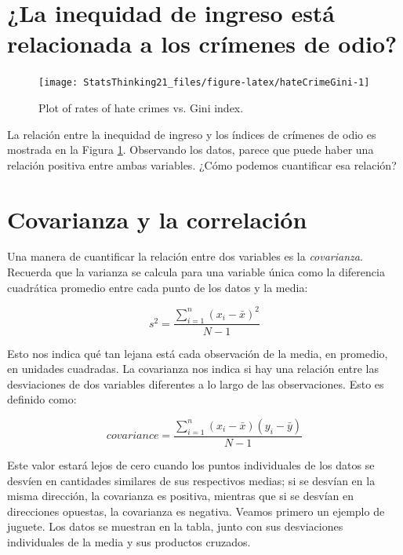 \documentclass[
  12pt,
]{book}
\begin{document}
\hypertarget{la-inequidad-de-ingreso-estuxe1-relacionada-a-los-cruxedmenes-de-odio}{%
\section{¿La inequidad de ingreso está relacionada a los crímenes de odio?}\label{la-inequidad-de-ingreso-estuxe1-relacionada-a-los-cruxedmenes-de-odio}}

\begin{figure}
\texttt{[image: StatsThinking21\_files/figure-latex/hateCrimeGini-1]} \caption{Plot of rates of hate crimes vs. Gini index.}\label{fig:hateCrimeGini}
\end{figure}

La relación entre la inequidad de ingreso y los índices de crímenes de odio es mostrada en la Figura \ref{fig:hateCrimeGini}.
Observando los datos, parece que puede haber una relación positiva entre ambas variables. ¿Cómo podemos cuantificar esa relación?

\hypertarget{covariance-and-correlation}{%
\section{Covarianza y la correlación}\label{covariance-and-correlation}}

Una manera de cuantificar la relación entre dos variables es la \emph{covarianza}. Recuerda que la varianza se calcula para una variable única como la diferencia cuadrática promedio entre cada punto de los datos y la media:

\[
s^2 = \frac{\sum_{i=1}^n (x_i - \bar{x})^2}{N - 1}
\]

Esto nos indica qué tan lejana está cada observación de la media, en promedio, en unidades cuadradas. La covarianza nos indica si hay una relación entre las desviaciones de dos variables diferentes a lo largo de las observaciones. Esto es definido como:

\[
covariance = \frac{\sum_{i=1}^n (x_i - \bar{x})(y_i - \bar{y})}{N - 1}
\]

Este valor estará lejos de cero cuando los puntos individuales de los datos se desvíen en cantidades similares de sus respectivos medias; si se desvían en la misma dirección, la covarianza es positiva, mientras que si se desvían en direcciones opuestas, la covarianza es negativa. Veamos primero un ejemplo de juguete. Los datos se muestran en la tabla, junto con sus desviaciones individuales de la media y sus productos cruzados.
\end{document}
